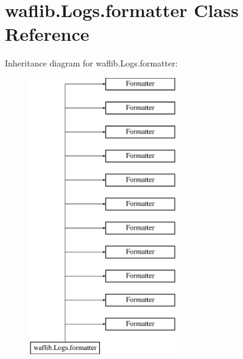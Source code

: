 \hypertarget{classwaflib_1_1_logs_1_1formatter}{}\section{waflib.\+Logs.\+formatter Class Reference}
\label{classwaflib_1_1_logs_1_1formatter}
Inheritance diagram for waflib.\+Logs.\+formatter\+:\begin{figure}[H]
\begin{center}
\leavevmode
\includegraphics[height=12.000000cm]{classwaflib_1_1_logs_1_1formatter}
\end{center}
\end{figure}
